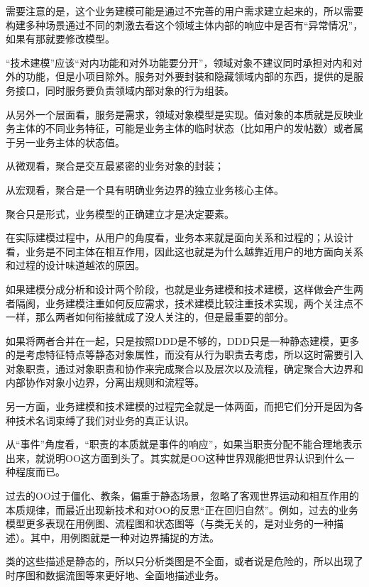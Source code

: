 需要注意的是，这个业务建模可能是通过不完善的用户需求建立起来的，所以需要构建多种场景通过不同的刺激去看这个领域主体内部的响应中是否有“异常情况”，如果有那就要修改模型。

“技术建模”应该“对内功能和对外功能要分开”，领域对象不建议同时承担对内和对外的功能，但是小项目除外。服务对外要封装和隐藏领域内部的东西，提供的是服务接口，同时服务要负责领域内部对象的行为组装。

从另外一个层面看，服务是需求，领域对象模型是实现。值对象的本质就是反映业务主体的不同业务特征，可能是业务主体的临时状态（比如用户的发帖数）或者属于另一业务主体的状态值。

\begin{compactitem}
\item 从微观看，聚合是交互最紧密的业务对象的封装；
\item 从宏观看，聚合是一个具有明确业务边界的独立业务核心主体。
\end{compactitem}

聚合只是形式，业务模型的正确建立才是决定要素。


在实际建模过程中，从用户的角度看，业务本来就是面向关系和过程的；从设计看，业务是不同主体在相互作用，因此这也就是为什么越靠近用户的地方面向关系和过程的设计味道越浓的原因。

如果建模分成分析和设计两个阶段，也就是业务建模和技术建模，这样做会产生两者隔阂，业务建模注重如何反应需求，技术建模比较注重技术实现，两个关注点不一样，那么两者如何衔接就成了没人关注的，但是最重要的部分。

如果将两者合并在一起，只是按照DDD是不够的，DDD只是一种静态建模，更多的是考虑特征特点等静态对象属性，而没有从行为职责去考虑，所以这时需要引入对象职责，通过对象职责和协作来完成聚合以及层次以及流程，确定聚合大边界和内部协作对象小边界，分离出规则和流程等。

另一方面，业务建模和技术建模的过程完全就是一体两面，而把它们分开是因为各种技术名词束缚了我们对业务的真正认识。


从“事件”角度看，“职责的本质就是事件的响应”，如果当职责分配不能合理地表示出来，就说明OO这方面到头了。其实就是OO这种世界观能把世界认识到什么一种程度而已。

过去的OO过于僵化、教条，偏重于静态场景，忽略了客观世界运动和相互作用的本质规律，而最近出现新技术和对OO的反思“正在回归自然”。例如，过去的业务模型更多表现在用例图、流程图和状态图等（与类无关的，是对业务的一种描述）。其中，用例图就是一种对边界捕捉的方法。


类的这些描述是静态的，所以只分析类图是不全面，或者说是危险的，所以出现了时序图和数据流图等来更好地、全面地描述业务。


